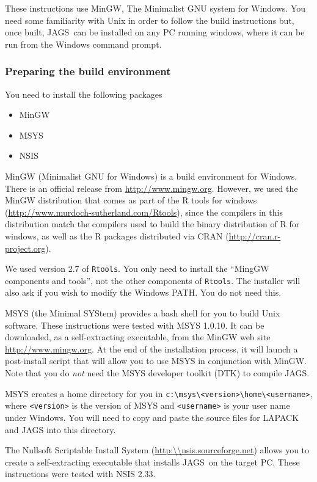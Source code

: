 \documentclass[11pt, a4paper, titlepage]{report}
\newcommand{\JAGS}{\textsf{JAGS}}
\begin{document}
These instructions use MinGW, The Minimalist GNU system for Windows.
You need some familiarity with Unix in order to follow the build
instructions but, once built, \JAGS\ can be installed on any PC
running windows, where it can be run from the Windows command prompt.

\subsubsection*{Preparing the build environment}

You need to install the following packages
\begin{itemize}
\item MinGW 
\item MSYS  
\item NSIS  
\end{itemize}

MinGW (Minimalist GNU for Windows) is a build environment for Windows.
There is an official release from \url{http://www.mingw.org}.
However, we used the MinGW distribution that comes as part of the R
tools for windows (\url{http://www.murdoch-sutherland.com/Rtools}),
since the compilers in this distribution match the compilers used to
build the binary distribution of R for windows, as well as the R
packages distributed via CRAN (\url{http://cran.r-project.org}).

We used version 2.7 of \verb+Rtools+.  You only need to install the
``MingGW components and tools'', not the other components of
\verb+Rtools+. The installer will also ask if you wish to modify the
Windows PATH. You do not need this.

MSYS (the Minimal SYStem) provides a bash shell for you to build Unix
software. These instructions were tested with MSYS 1.0.10.  It can be
downloaded, as a self-extracting executable, from the MinGW web site
\url{http://www.mingw.org}. At the end of the installation process, it
will launch a post-install script that will allow you to use MSYS in
conjunction with MinGW. Note that you do {\em not} need the MSYS
developer toolkit (DTK) to compile \JAGS.

MSYS creates a home directory for you in
\verb+c:\msys\<version>\home\<username>+, where \texttt{<version>} is
the version of MSYS and \texttt{<username>} is your user name under
Windows. You will need to copy and paste the source files for LAPACK
and JAGS into this directory.

The Nullsoft Scriptable Install System
(\url{http:\\nsis.sourceforge.net}) allows you to create a
self-extracting executable that installs \JAGS\ on the target PC.
These instructions were tested with NSIS 2.33.
\end{document}
